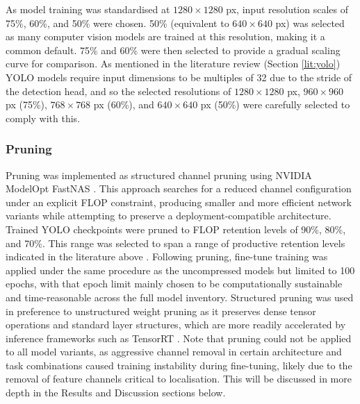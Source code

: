 As model training was standardised at $1280 \times 1280$ px, input resolution scales of 75\%, 60\%, and 50\% were chosen. 50\% (equivalent to $640\times640$ px) was selected as many computer vision models are trained at this resolution, making it a common default. 75\% and 60\% were then selected to provide a gradual scaling curve for comparison. As mentioned in the literature review (Section \ref{lit:yolo}) YOLO models require input dimensions to be multiples of 32 due to the stride of the detection head, and so the selected resolutions of $1280 \times 1280$ px, $960 \times 960$ px (75\%), $768 \times 768$ px (60\%), and $640 \times 640$ px (50\%) were carefully selected to comply with this.

\subsubsection{Pruning}
Pruning was implemented as structured channel pruning using NVIDIA ModelOpt FastNAS \cite{248452, nvidia_modelopt}. This approach searches for a reduced channel configuration under an explicit FLOP constraint, producing smaller and more efficient network variants while attempting to preserve a deployment-compatible architecture. Trained YOLO checkpoints were pruned to FLOP retention levels of 90\%, 80\%, and 70\%. This range was selected to span a range of productive retention levels indicated in the literature above \cite{10204354}. Following pruning, fine-tune training was applied under the same procedure as the uncompressed models but limited to 100 epochs, with that epoch limit mainly chosen to be computationally sustainable and time-reasonable across the full model inventory. Structured pruning was used in preference to unstructured weight pruning as it preserves dense tensor operations and standard layer structures, which are more readily accelerated by inference frameworks such as TensorRT \cite{nvidia_modelopt}. Note that pruning could not be applied to all model variants, as aggressive channel removal in certain architecture and task combinations caused training instability during fine-tuning, likely due to the removal of feature channels critical to localisation. This will be discussed in more depth in the Results and Discussion sections below.

